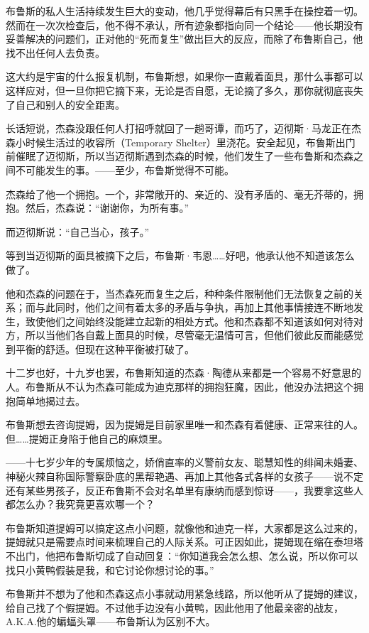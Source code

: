 \documentclass[../main]{subfiles}
\begin{document}
布鲁斯的私人生活持续发生巨大的变动，他几乎觉得幕后有只黑手在操控着一切。然而在一次次检查后，他不得不承认，所有迹象都指向同一个结论——他长期没有妥善解决的问题们，正对他的“死而复生”做出巨大的反应，而除了布鲁斯自己，他找不出任何人去负责。

这大约是宇宙的什么报复机制，布鲁斯想，如果你一直戴着面具，那什么事都可以这样应对，但一旦你把它摘下来，无论是否自愿，无论摘了多久，那你就彻底丧失了自己和别人的安全距离。

长话短说，杰森没跟任何人打招呼就回了一趟哥谭，而巧了，迈彻斯·马龙正在杰森小时候生活过的收容所（Temporary
Shelter）里浇花。安全起见，布鲁斯出门前催眠了迈彻斯，所以当迈彻斯遇到杰森的时候，他们发生了一些布鲁斯和杰森之间不可能发生的事。——至少，布鲁斯觉得不可能。

杰森给了他一个拥抱。一个，非常敞开的、亲近的、没有矛盾的、毫无芥蒂的，拥抱。然后，杰森说：“谢谢你，为所有事。”

而迈彻斯说：“自己当心，孩子。”

等到当迈彻斯的面具被摘下之后，布鲁斯·韦恩……好吧，他承认他不知道该怎么做了。

他和杰森的问题在于，当杰森死而复生之后，种种条件限制他们无法恢复之前的关系；而与此同时，他们之间有着太多的矛盾与争执，再加上其他事情接连不断地发生，致使他们之间始终没能建立起新的相处方式。他和杰森都不知道该如何对待对方，所以当他们各自戴上面具的时候，尽管毫无温情可言，但他们彼此反而能感觉到平衡的舒适。但现在这种平衡被打破了。

十二岁也好，十九岁也罢，布鲁斯知道的杰森·陶德从来都是一个容易不好意思的人。布鲁斯从不认为杰森可能成为迪克那样的拥抱狂魔，因此，他没办法把这个拥抱简单地揭过去。

布鲁斯想去咨询提姆，因为提姆是目前家里唯一和杰森有着健康、正常来往的人。但……提姆正身陷于他自己的麻烦里。

——十七岁少年的专属烦恼之，娇俏直率的义警前女友、聪慧知性的绯闻未婚妻、神秘火辣自称国际警察卧底的黑帮艳遇、再加上其他各式各样的女孩子——说不定还有某些男孩子，反正布鲁斯不会对名单里有康纳而感到惊讶——，我要拿这些人都怎么办？我究竟更喜欢哪一个？

布鲁斯知道提姆可以搞定这点小问题，就像他和迪克一样，大家都是这么过来的，提姆就只是需要点时间来梳理自己的人际关系。可正因如此，提姆现在缩在泰坦塔不出门，他把布鲁斯切成了自动回复：“你知道我会怎么想、怎么说，所以你可以找只小黄鸭假装是我，和它讨论你想讨论的事。”

布鲁斯并不想为了他和杰森这点小事就动用紧急线路，所以他听从了提姆的建议，给自己找了个假提姆。不过他手边没有小黄鸭，因此他用了他最亲密的战友，A.K.A.他的蝙蝠头罩——布鲁斯认为区别不大。
\end{document}
